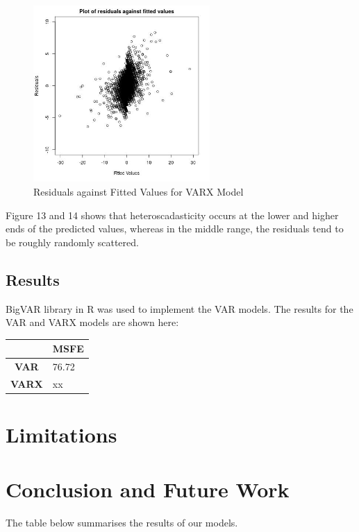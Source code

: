 \documentclass[12pt, letterpaper] {article}
\begin{document}
\begin{figure}[H]
    \centering
    \includegraphics[width=0.6\textwidth, height=0.3\textheight]{Images/Full_VARX_diff_resids_vs_values.jpg}
    \caption{Residuals against Fitted Values for VARX Model}
    \label{fig:Residuals against Fitted Values for VARX Model}
\end{figure}

Figure 13 and 14 shows that heteroscadasticity occurs at the lower and higher ends of the predicted values, whereas in the middle range, the residuals tend to be roughly randomly scattered.

\subsection{Results}
BigVAR library in R was used to implement the VAR models. The results for the VAR and VARX models are shown here:

\begin{table}[H]
\centering
\begin{tabular}{|l|l|}
\hline
                                   & \textbf{MSFE} \\ \hline
\multicolumn{1}{|c|}{\textbf{VAR}} & 76.72            \\ \hline
\textbf{VARX}                      & xx            \\ \hline
\end{tabular}
\end{table}

\section{Limitations}


\section{Conclusion and Future Work}
The table below summarises the results of our models. 
\end{document}
